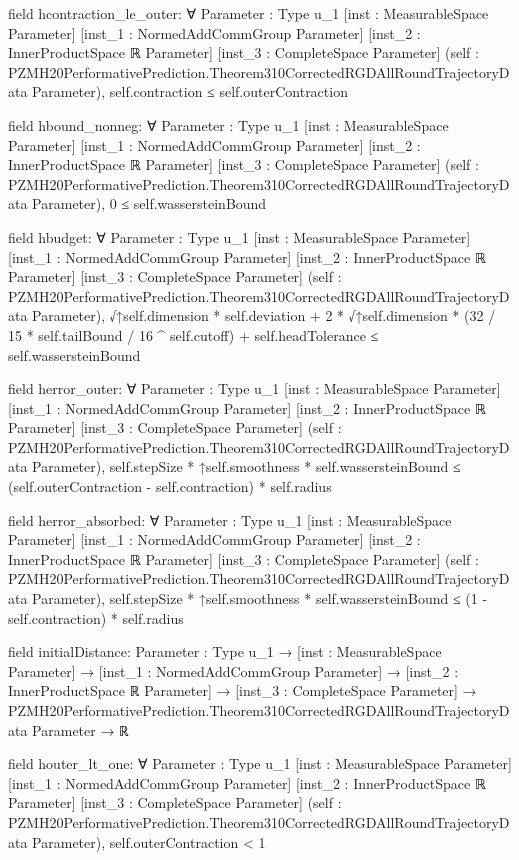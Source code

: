 \documentclass[10pt]{article}
\begin{document}
\begin{ReviewVerbatim}
field hcontraction_le_outer:
∀ {Parameter : Type u_1} [inst : MeasurableSpace Parameter] [inst_1 : NormedAddCommGroup Parameter]
  [inst_2 : InnerProductSpace ℝ Parameter] [inst_3 : CompleteSpace Parameter]
  (self : PZMH20PerformativePrediction.Theorem310CorrectedRGDAllRoundTrajectoryData Parameter),
  self.contraction ≤ self.outerContraction

field hbound_nonneg:
∀ {Parameter : Type u_1} [inst : MeasurableSpace Parameter] [inst_1 : NormedAddCommGroup Parameter]
  [inst_2 : InnerProductSpace ℝ Parameter] [inst_3 : CompleteSpace Parameter]
  (self : PZMH20PerformativePrediction.Theorem310CorrectedRGDAllRoundTrajectoryData Parameter),
  0 ≤ self.wassersteinBound

field hbudget:
∀ {Parameter : Type u_1} [inst : MeasurableSpace Parameter] [inst_1 : NormedAddCommGroup Parameter]
  [inst_2 : InnerProductSpace ℝ Parameter] [inst_3 : CompleteSpace Parameter]
  (self : PZMH20PerformativePrediction.Theorem310CorrectedRGDAllRoundTrajectoryData Parameter),
  √↑self.dimension * self.deviation + 2 * √↑self.dimension * (32 / 15 * self.tailBound / 16 ^ self.cutoff) +
      self.headTolerance ≤
    self.wassersteinBound

field herror_outer:
∀ {Parameter : Type u_1} [inst : MeasurableSpace Parameter] [inst_1 : NormedAddCommGroup Parameter]
  [inst_2 : InnerProductSpace ℝ Parameter] [inst_3 : CompleteSpace Parameter]
  (self : PZMH20PerformativePrediction.Theorem310CorrectedRGDAllRoundTrajectoryData Parameter),
  self.stepSize * ↑self.smoothness * self.wassersteinBound ≤ (self.outerContraction - self.contraction) * self.radius

field herror_absorbed:
∀ {Parameter : Type u_1} [inst : MeasurableSpace Parameter] [inst_1 : NormedAddCommGroup Parameter]
  [inst_2 : InnerProductSpace ℝ Parameter] [inst_3 : CompleteSpace Parameter]
  (self : PZMH20PerformativePrediction.Theorem310CorrectedRGDAllRoundTrajectoryData Parameter),
  self.stepSize * ↑self.smoothness * self.wassersteinBound ≤ (1 - self.contraction) * self.radius

field initialDistance:
{Parameter : Type u_1} →
  [inst : MeasurableSpace Parameter] →
    [inst_1 : NormedAddCommGroup Parameter] →
      [inst_2 : InnerProductSpace ℝ Parameter] →
        [inst_3 : CompleteSpace Parameter] →
          PZMH20PerformativePrediction.Theorem310CorrectedRGDAllRoundTrajectoryData Parameter → ℝ

field houter_lt_one:
∀ {Parameter : Type u_1} [inst : MeasurableSpace Parameter] [inst_1 : NormedAddCommGroup Parameter]
  [inst_2 : InnerProductSpace ℝ Parameter] [inst_3 : CompleteSpace Parameter]
  (self : PZMH20PerformativePrediction.Theorem310CorrectedRGDAllRoundTrajectoryData Parameter),
  self.outerContraction < 1


\end{ReviewVerbatim}
\end{document}
